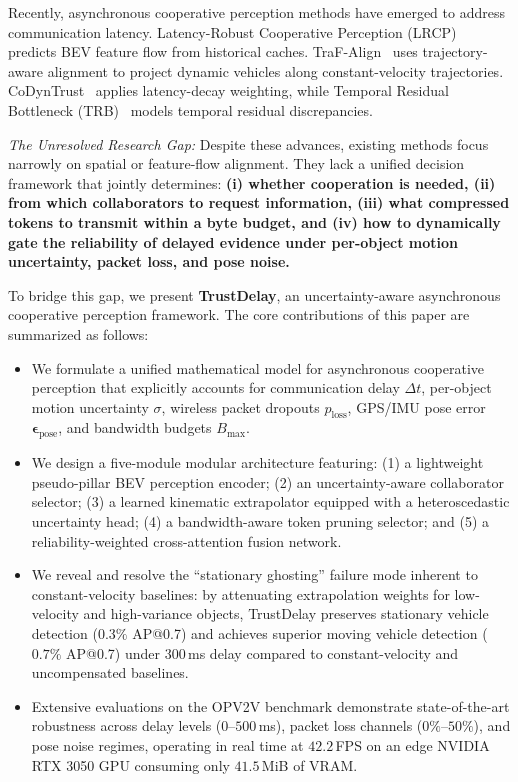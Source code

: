 \documentclass[10pt,journal,compsoc]{IEEEtran}
\begin{document}
Recently, asynchronous cooperative perception methods have emerged to address communication latency. Latency-Robust Cooperative Perception (LRCP)~\cite{lrcp2023latency} predicts BEV feature flow from historical caches. TraF-Align~\cite{song2025trafalign} uses trajectory-aware alignment to project dynamic vehicles along constant-velocity trajectories. CoDynTrust~\cite{codyntrust2024} applies latency-decay weighting, while Temporal Residual Bottleneck (TRB)~\cite{trb2024temporal} models temporal residual discrepancies. 

\textit{The Unresolved Research Gap:} Despite these advances, existing methods focus narrowly on spatial or feature-flow alignment. They lack a unified decision framework that jointly determines: \textbf{(i) whether cooperation is needed, (ii) from which collaborators to request information, (iii) what compressed tokens to transmit within a byte budget, and (iv) how to dynamically gate the reliability of delayed evidence under per-object motion uncertainty, packet loss, and pose noise.}

To bridge this gap, we present \textbf{TrustDelay}, an uncertainty-aware asynchronous cooperative perception framework. The core contributions of this paper are summarized as follows:
\begin{itemize}
    \item We formulate a unified mathematical model for asynchronous cooperative perception that explicitly accounts for communication delay $\Delta t$, per-object motion uncertainty $\sigma$, wireless packet dropouts $p_{\text{loss}}$, GPS/IMU pose error $\mathbf{\epsilon}_{\text{pose}}$, and bandwidth budgets $B_{\max}$.
    \item We design a five-module modular architecture featuring: (1) a lightweight pseudo-pillar BEV perception encoder; (2) an uncertainty-aware collaborator selector; (3) a learned kinematic extrapolator equipped with a heteroscedastic uncertainty head; (4) a bandwidth-aware token pruning selector; and (5) a reliability-weighted cross-attention fusion network.
    \item We reveal and resolve the ``stationary ghosting'' failure mode inherent to constant-velocity baselines: by attenuating extrapolation weights for low-velocity and high-variance objects, TrustDelay preserves stationary vehicle detection ($0.3\%$ AP@0.7) and achieves superior moving vehicle detection ($0.7\%$ AP@0.7) under $300$\,ms delay compared to constant-velocity and uncompensated baselines.
    \item Extensive evaluations on the OPV2V benchmark demonstrate state-of-the-art robustness across delay levels ($0\text{--}500$\,ms), packet loss channels ($0\%\text{--}50\%$), and pose noise regimes, operating in real time at $42.2$\,FPS on an edge NVIDIA RTX 3050 GPU consuming only $41.5$\,MiB of VRAM.
\end{itemize}
\end{document}
